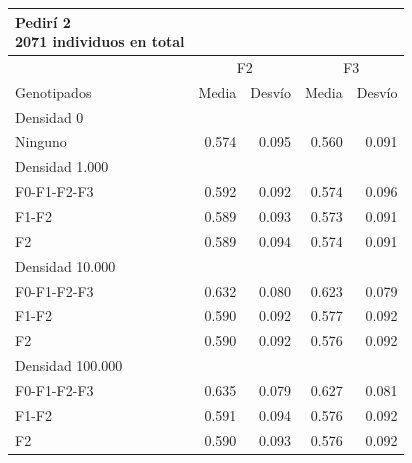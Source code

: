 \documentclass[11pt,spanish,a4paper,oneside,]{book} %
\begin{document}
\begin{longtable}{lrrrr}
\caption*{
{\large Pedirí 2} \\ 
{\small 2071 individuos en total}
} \\ 
\toprule
 & \multicolumn{2}{c}{F2} & \multicolumn{2}{c}{F3} \\ 
 \cmidrule(lr){2-3} \cmidrule(lr){4-5}
Genotipados & Media & Desvío & Media & Desvío \\ 
\midrule
\multicolumn{1}{l}{Densidad 0} \\ 
\midrule
Ninguno & 0.574 & 0.095 & 0.560 & 0.091 \\ 
\midrule
\multicolumn{1}{l}{Densidad 1.000} \\ 
\midrule
F0-F1-F2-F3 & 0.592 & 0.092 & 0.574 & 0.096 \\ 
F1-F2 & 0.589 & 0.093 & 0.573 & 0.091 \\ 
F2 & 0.589 & 0.094 & 0.574 & 0.091 \\ 
\midrule
\multicolumn{1}{l}{Densidad 10.000} \\ 
\midrule
F0-F1-F2-F3 & 0.632 & 0.080 & 0.623 & 0.079 \\ 
F1-F2 & 0.590 & 0.092 & 0.577 & 0.092 \\ 
F2 & 0.590 & 0.092 & 0.576 & 0.092 \\ 
\midrule
\multicolumn{1}{l}{Densidad 100.000} \\ 
\midrule
F0-F1-F2-F3 & 0.635 & 0.079 & 0.627 & 0.081 \\ 
F1-F2 & 0.591 & 0.094 & 0.576 & 0.092 \\ 
F2 & 0.590 & 0.093 & 0.576 & 0.092 \\ 
 \bottomrule
\end{longtable}
\captionsetup[table]{labelformat=empty,skip=1pt}
\end{document}
